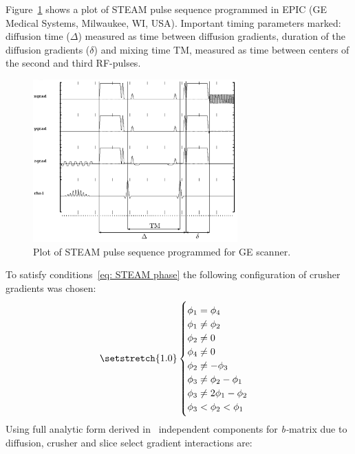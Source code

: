 Figure~\ref{fig: STEAM_GE} shows a plot of STEAM pulse sequence programmed in EPIC (GE Medical Systems, Milwaukee, WI, USA). 
Important timing parameters marked: diffusion time ($\Delta$) measured as time between diffusion gradients, duration of the diffusion gradients ($\delta$) and mixing time TM, measured as time between centers of the second and third RF-pulses.
\begin{figure}[h]
\vspace{+0.2cm}
\centering
\includegraphics[width =0.7\textwidth]{Figures/STEAM_GE.pdf}
\caption[Plot of STEAM pulse sequence programmed for GE scanner]{Plot of STEAM pulse sequence programmed for GE scanner.}\label{fig: STEAM_GE} 
\end{figure}
To satisfy conditions~\ref{eq: STEAM phase} the following configuration of crusher gradients was chosen:
\begin{equation}\label{eq: bmatrix}
{\setstretch{1.0}
\begin{cases}
    \phi_1 = \phi_4\\
    \phi_1 \neq \phi_2\\
    \phi_2 \neq 0\\
    \phi_4 \neq 0\\
    \phi_2 \neq - \phi_3\\
    \phi_3 \neq \phi_2 - \phi_1\\
    \phi_3 \neq 2\phi_1 - \phi_2\\
    \phi_3 < \phi_2 < \phi_1
\end{cases}
}
\end{equation}
Using full analytic form derived in~\cite{RNDT} independent components for \textit{b-}matrix due to diffusion, crusher and slice select gradient interactions are:
